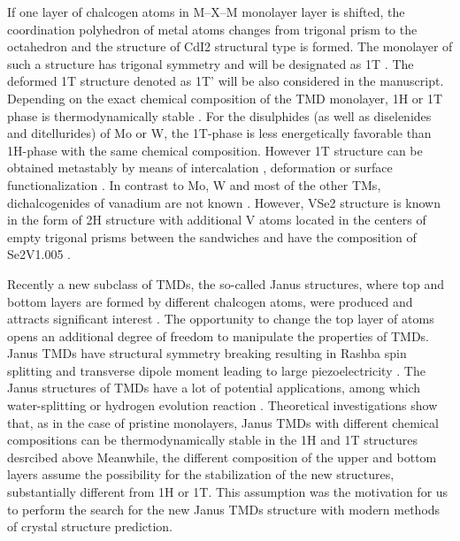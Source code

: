 \documentclass[a4paperm]{article}
\begin{document}
If one layer of chalcogen atoms in M--X--M monolayer  layer is shifted, the coordination polyhedron of metal atoms changes from trigonal prism to the octahedron and the structure of CdI2 structural type is formed. 
The monolayer of such a structure has trigonal symmetry and will be designated as 1T \cite{huang2020recent}. 
The deformed 1T structure denoted as 1T' \cite{huang2020recent} will be also considered in the manuscript.
Depending on the exact chemical composition of the TMD monolayer, 1H or 1T phase is thermodynamically stable \cite{ataca2012stable}. 
For the disulphides (as well as diselenides and ditellurides) of Mo or W, the  1T-phase is less energetically favorable than 1H-phase with the same chemical composition. 
However 1T structure can be obtained metastably by means of intercalation \cite{kan2014structures, wang2014atomic}, deformation \cite{duerloo2014structural} or surface functionalization \cite{tang2015stabilization, voiry2015covalent}. 
In contrast to Mo, W and most of the other TMs, dichalcogenides of vanadium are not known \cite{murphy1977preparation, le1979elaboration}. 
However, VSe2 structure is known in the form of 2H structure with additional V atoms located in the centers of empty trigonal prisms between the sandwiches and have the composition of Se2V1.005 \cite{rigoult1982}.

Recently a new subclass of TMDs, the so-called Janus structures, where top and bottom layers are formed by different chalcogen atoms, were produced and attracts significant interest \cite{lu2017, zhang2017janus}. 
The opportunity to change the top layer of atoms opens an additional degree of freedom to manipulate the properties of TMDs. 
Janus TMDs have structural symmetry breaking \cite{li2017electronic, van2020first} resulting in Rashba spin splitting \cite{hu2018intrinsic} and transverse dipole moment leading to large piezoelectricity \cite{dong2017large, li2018recent}. 
The Janus structures of TMDs have a lot of potential applications, among which water-splitting \cite{xia2018universality, ma2018janus} or hydrogen evolution reaction \cite{er2018prediction, zhou2019janus}. 
Theoretical investigations show that, as in the case of pristine monolayers, Janus TMDs with different chemical compositions can be thermodynamically stable in the 1H and 1T structures desrcibed above
Meanwhile, the different composition of the upper and bottom layers assume the possibility for the stabilization of the new structures, substantially different from 1H or 1T.
This assumption was the motivation for us to perform the search for the new Janus TMDs structure with modern methods of crystal structure prediction.
\end{document}

